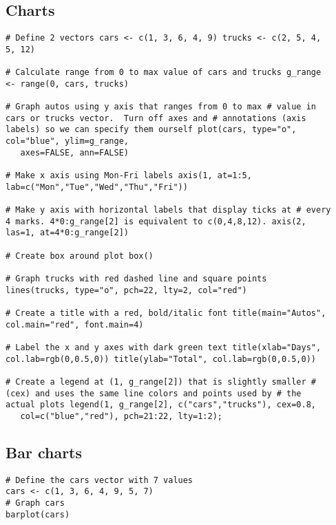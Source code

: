 \documentclass[a4paper,12pt]{article}
\begin{document}
\subsection{ Charts}

\begin{myindentpar}{1cm}
\begin{verbatim}
# Define 2 vectors cars <- c(1, 3, 6, 4, 9) trucks <- c(2, 5, 4,
5, 12)

# Calculate range from 0 to max value of cars and trucks g_range
<- range(0, cars, trucks)

# Graph autos using y axis that ranges from 0 to max # value in
cars or trucks vector.  Turn off axes and # annotations (axis
labels) so we can specify them ourself plot(cars, type="o",
col="blue", ylim=g_range,
   axes=FALSE, ann=FALSE)

# Make x axis using Mon-Fri labels axis(1, at=1:5,
lab=c("Mon","Tue","Wed","Thu","Fri"))

# Make y axis with horizontal labels that display ticks at # every
4 marks. 4*0:g_range[2] is equivalent to c(0,4,8,12). axis(2,
las=1, at=4*0:g_range[2])

# Create box around plot box()

# Graph trucks with red dashed line and square points
lines(trucks, type="o", pch=22, lty=2, col="red")

# Create a title with a red, bold/italic font title(main="Autos",
col.main="red", font.main=4)

# Label the x and y axes with dark green text title(xlab="Days",
col.lab=rgb(0,0.5,0)) title(ylab="Total", col.lab=rgb(0,0.5,0))

# Create a legend at (1, g_range[2]) that is slightly smaller #
(cex) and uses the same line colors and points used by # the
actual plots legend(1, g_range[2], c("cars","trucks"), cex=0.8,
   col=c("blue","red"), pch=21:22, lty=1:2);

\end{verbatim}
\end{myindentpar}
\subsection{Bar charts}
\begin{myindentpar}{1cm}
\begin{verbatim}
# Define the cars vector with 7 values
cars <- c(1, 3, 6, 4, 9, 5, 7)
# Graph cars
barplot(cars)
\end{verbatim}
\end{myindentpar}
\end{document}
